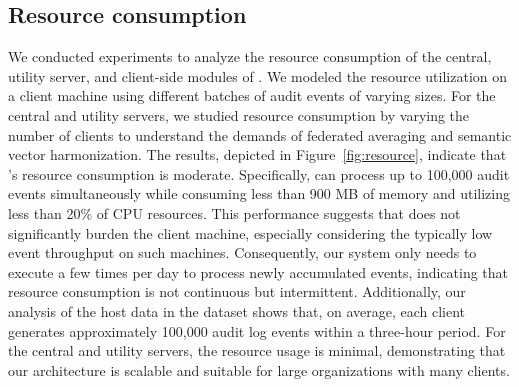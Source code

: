  \subsection{Resource consumption}

 We conducted experiments to analyze the resource consumption of the central, utility server, and client-side modules of \Sys. We modeled the resource utilization on a client machine using different batches of audit events of varying sizes. For the central and utility servers, we studied resource consumption by varying the number of clients to understand the demands of federated averaging and semantic vector harmonization. The results, depicted in Figure~\ref{fig:resource}, indicate that \Sys's resource consumption is moderate. Specifically, \Sys can process up to 100,000 audit events simultaneously while consuming less than 900 MB of memory and utilizing less than 20\% of CPU resources. This performance suggests that \Sys does not significantly burden the client machine, especially considering the typically low event throughput on such machines. Consequently, our system only needs to execute a few times per day to process newly accumulated events, indicating that resource consumption is not continuous but intermittent. Additionally, our analysis of the host data in the \optc dataset shows that, on average, each client generates approximately 100,000 audit log events within a three-hour period. For the central and utility servers, the resource usage is minimal, demonstrating that our architecture is scalable and suitable for large organizations with many clients.


